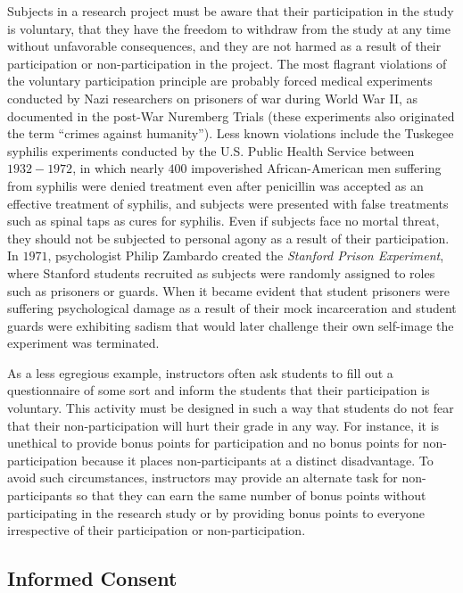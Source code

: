 Subjects in a research project must be aware that their participation in the study is voluntary, that they have the freedom to withdraw from the study at any time without unfavorable consequences, and they are not harmed as a result of their participation or non-participation in the project. The most flagrant violations of the voluntary participation principle are probably forced medical experiments conducted by Nazi researchers on prisoners of war during World War II, as documented in the post-War Nuremberg Trials (these experiments also originated the term ``crimes against humanity''). Less known violations include the Tuskegee syphilis experiments\cite{reverby2009examining} conducted by the U.S. Public Health Service between $ 1932-1972 $, in which nearly $ 400 $ impoverished African-American men suffering from syphilis were denied treatment even after penicillin was accepted as an effective treatment of syphilis, and subjects were presented with false treatments such as spinal taps as cures for syphilis. Even if subjects face no mortal threat, they should not be subjected to personal agony as a result of their participation. In $ 1971 $, psychologist Philip Zambardo created the \textit{Stanford Prison Experiment}, where Stanford students recruited as subjects were randomly assigned to roles such as prisoners or guards. When it became evident that student prisoners were suffering psychological damage as a result of their mock incarceration and student guards were exhibiting sadism that would later challenge their own self-image the experiment was terminated.

As a less egregious example, instructors often ask students to fill out a questionnaire of some sort and inform the students that their participation is voluntary. This activity must be designed in such a way that students do not fear that their non-participation will hurt their grade in any way. For instance, it is unethical to provide bonus points for participation and no bonus points for non-participation because it places non-participants at a distinct disadvantage. To avoid such circumstances, instructors may provide an alternate task for non-participants so that they can earn the same number of bonus points without participating in the research study or by providing bonus points to everyone irrespective of their participation or non-participation. 

\subsection{Informed Consent}

